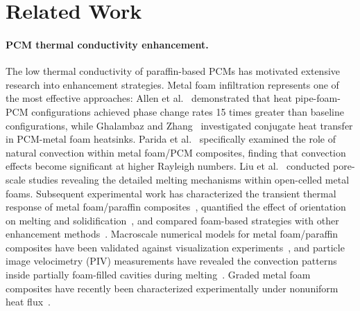 \section{Related Work}
\label{sec:related}

\paragraph{PCM thermal conductivity enhancement.}
The low thermal conductivity of paraffin-based PCMs has motivated extensive research into enhancement strategies. Metal foam infiltration represents one of the most effective approaches: Allen et al.~\cite{allen2015robust} demonstrated that heat pipe-foam-PCM configurations achieved phase change rates 15 times greater than baseline configurations, while Ghalambaz and Zhang~\cite{ghalambaz2020conjugate} investigated conjugate heat transfer in PCM-metal foam heatsinks. Parida et al.~\cite{parida2020effect} specifically examined the role of natural convection within metal foam/PCM composites, finding that convection effects become significant at higher Rayleigh numbers. Liu et al.~\cite{liu2024pore} conducted pore-scale studies revealing the detailed melting mechanisms within open-celled metal foams. Subsequent experimental work has characterized the transient thermal response of metal foam/paraffin composites~\cite{yu2022temperature,duan2021transient}, quantified the effect of orientation on melting and solidification~\cite{allen2015effect}, and compared foam-based strategies with other enhancement methods~\cite{song2015thermal,zhu2016numerical}. Macroscale numerical models for metal foam/paraffin composites have been validated against visualization experiments~\cite{yao2019numerical}, and particle image velocimetry (PIV) measurements have revealed the convection patterns inside partially foam-filled cavities during melting~\cite{liu2022piv}. Graded metal foam composites have recently been characterized experimentally under nonuniform heat flux~\cite{shen2025experimental}.
